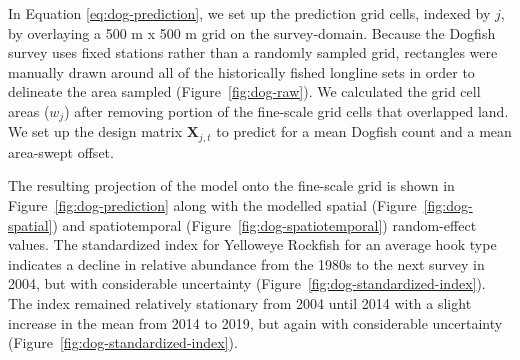 \documentclass[11pt]{book}
\begin{document}
In Equation \eqref{eq:dog-prediction}, we set up the prediction grid cells, indexed by \(j\), by overlaying a 500 m x 500 m grid on the survey-domain. Because the Dogfish survey uses fixed stations rather than a randomly sampled grid, rectangles were manually drawn around all of the historically fished longline sets in order to delineate the area sampled (Figure~\ref{fig:dog-raw}). We calculated the grid cell areas (\(w_j\)) after removing portion of the fine-scale grid cells that overlapped land. We set up the design matrix \(\bm{X}_{j,t}\) to predict for a mean Dogfish count and a mean area-swept offset.

The resulting projection of the model onto the fine-scale grid is shown in Figure~\ref{fig:dog-prediction} along with the modelled spatial (Figure~\ref{fig:dog-spatial}) and spatiotemporal (Figure~\ref{fig:dog-spatiotemporal}) random-effect values. The standardized index for Yelloweye Rockfish for an average hook type indicates a decline in relative abundance from the 1980s to the next survey in 2004, but with considerable uncertainty (Figure~\ref{fig:dog-standardized-index}). The index remained relatively stationary from 2004 until 2014 with a slight increase in the mean from 2014 to 2019, but again with considerable uncertainty (Figure~\ref{fig:dog-standardized-index}).
\end{document}
